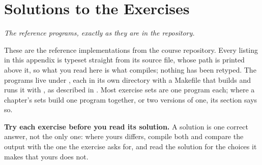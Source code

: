 
\chapter{Solutions to the Exercises}
\label{sol:ch:solutions}

{\large\itshape The reference programs, exactly as they are in the repository.\par}

These are the reference implementations from the course repository. Every listing in this appendix
is typeset straight from its source file, whose path is printed above it, so what you read here is
what  compiles; nothing has been retyped. The programs live under
, each in its own directory with a Makefile that builds and
runs it with , as described in . Most exercise sets are one
program each; where a chapter's sets build one program together, or two versions of one, its
section says so.

\textbf{Try each exercise before you read its solution.} A solution is one correct answer, not the
only one: where yours differs, compile both and compare the output with the one the exercise asks
for, and read the solution for the choices it makes that yours does not.







